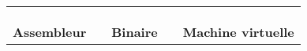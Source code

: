 \documentclass[11pt]{article}
\begin{document}
	\begin{table}[h]
	\centering
	\begin{tabular}{ll|ll|l}
		 & &  & &  \\ \\
		\hline
		\\
		\textbf{Assembleur} & & \textbf{Binaire} & & \textbf{Machine virtuelle}
	\end{tabular}
	\end{table}
\end{document}
